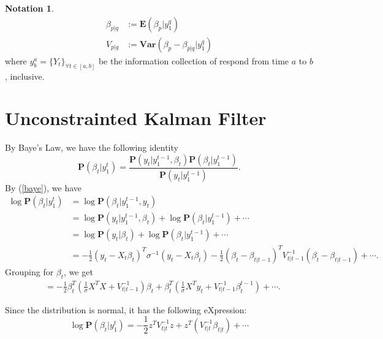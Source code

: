 \documentclass{article}
\numberwithin{algorithm}{section}
\theoremstyle{plain}
\theoremstyle{definition}
\newtheorem{notation}[thm]{Notation}\small
\theoremstyle{remark}
\newcommand{\E}{\mathbf{E}}
\newcommand{\Var}{\mathbf{Var}}
\newcommand{\PP}{\mathbf{P}}
\begin{document}
\begin{notation}
\begin{equation*}
\begin{split}
\beta_{p|q} &:= \E(\beta_p |y^q_1 )\\
V_{p|q} &:= \Var(\beta_p - \beta_{p|q} |y^q_1  ) 
\end{split}
\end{equation*}
where $y^a_b = \{Y_t\}_{\forall t \in [a,b]}$ be the information collection of respond from time $a$ to $b$, inclusive.
\end{notation}

\section{Unconstrainted Kalman Filter}
By Baye's Law, we have the following identity
\begin{equation}
\PP(\beta_t | y_1^t) = \frac{ \PP(y_t |  y^{t-1}_1, \beta_t) \PP ( \beta_t | y ^{t-1}_1)}{\PP(y_t |  y_1^{t-1})}.
\label{baye}
\end{equation}
By (\ref{baye}), we have 
\begin{equation}
\begin{split}
\log \PP(\beta_t |  y^t_1) &= \log \PP(\beta_t |  y^{t-1}_1, y_t)\\
&= \log \PP(y_t |  y^{t-1}_1, \beta_t) + \log \PP ( \beta_t | y ^{t-1}_1) + \cdots\\
&= \log \PP(y_t |  \beta_t) + \log \PP ( \beta_t | y ^{t-1}_1) + \cdots\\
&= - \frac12 (y_t - X_t \beta_t )^T \sigma ^{-1}  (y_t - X_t \beta_t ) - \frac12 (\beta_t - \beta_{t|t-1})^T V_{t|t-1}^{-1} (\beta_t - \beta_{t|t-1})+ \cdots.
\end{split}
\end{equation}
Grouping for $\beta_t$, we get
\begin{equation}
\begin{split}
&= - \frac12 \beta^T_t (\frac1\sigma X^T X + V_{t|t-1}^{-1}) \beta_t + \beta^T_t ( \frac1\sigma X^T y_t + V_{t|t-1}^{-1} \beta_t^{t-1}) + \cdots.
\end{split}
\end{equation}

Since the distribution is normal, it has the following eXpression:
\begin{equation}
\log \PP(\beta_t |  y^t_1) = -\frac12 z^T V_{t|t}^{-1} z + z^T ( V_{t|t}^{-1} \beta_{t|t}) + \cdots
\end{equation}
\end{document}
